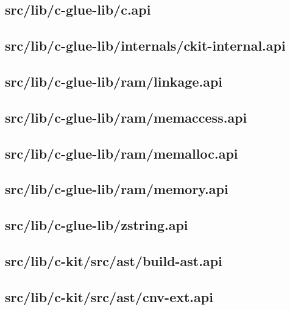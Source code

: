 \subsection{src/lib/c-glue-lib/c.api}


\subsection{src/lib/c-glue-lib/internals/ckit-internal.api}


\subsection{src/lib/c-glue-lib/ram/linkage.api}


\subsection{src/lib/c-glue-lib/ram/memaccess.api}


\subsection{src/lib/c-glue-lib/ram/memalloc.api}


\subsection{src/lib/c-glue-lib/ram/memory.api}


\subsection{src/lib/c-glue-lib/zstring.api}


\subsection{src/lib/c-kit/src/ast/build-ast.api}


\subsection{src/lib/c-kit/src/ast/cnv-ext.api}


